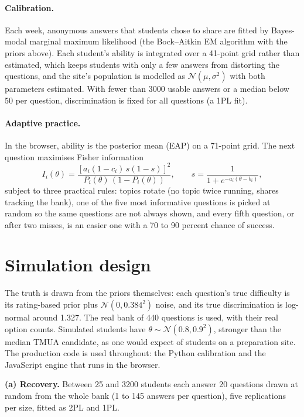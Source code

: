 \documentclass[11pt,a4paper]{article}
\begin{document}
\paragraph{Calibration.} Each week, anonymous answers that students chose to share are fitted by Bayes-modal marginal maximum likelihood (the Bock--Aitkin EM algorithm with the priors above). Each student's ability is integrated over a 41-point grid rather than estimated, which keeps students with only a few answers from distorting the questions, and the site's population is modelled as $\mathcal{N}(\mu, \sigma^2)$ with both parameters estimated. With fewer than 3000 usable answers or a median below 50 per question, discrimination is fixed for all questions (a 1PL fit).

\paragraph{Adaptive practice.} In the browser, ability is the posterior mean (EAP) on a 71-point grid. The next question maximises Fisher information
\begin{equation}
I_i(\theta) = \frac{\left[a_i (1-c_i)\, s(1-s)\right]^2}{P_i(\theta)\,(1-P_i(\theta))}, \qquad s = \frac{1}{1+e^{-a_i(\theta-b_i)}},
\end{equation}
subject to three practical rules: topics rotate (no topic twice running, shares tracking the bank), one of the five most informative questions is picked at random so the same questions are not always shown, and every fifth question, or after two misses, is an easier one with a 70 to 90 percent chance of success.

\section{Simulation design}

The truth is drawn from the priors themselves: each question's true difficulty is its rating-based prior plus $\mathcal{N}(0, 0.384^2)$ noise, and its true discrimination is log-normal around 1.327. The real bank of 440 questions is used, with their real option counts. Simulated students have $\theta \sim \mathcal{N}(0.8, 0.9^2)$, stronger than the median TMUA candidate, as one would expect of students on a preparation site. The production code is used throughout: the Python calibration and the JavaScript engine that runs in the browser.

\textbf{(a) Recovery.} Between 25 and 3200 students each answer 20 questions drawn at random from the whole bank (1 to 145 answers per question), five replications per size, fitted as 2PL and 1PL.
\end{document}
